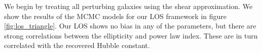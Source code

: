We begin by treating all perturbing galaxies using the shear approximation. We show the results of the MCMC models for our LOS framework in figure \ref{fig:los_triangle}. Our LOS shows no bias in any of the parameters, but there are strong correlations between the ellipticity and power law index. These are in turn correlated with the recovered Hubble constant. 